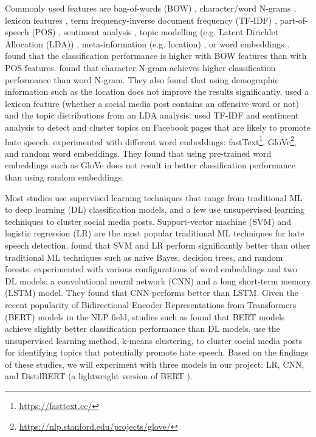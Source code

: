 %
Commonly used features are bag-of-words (BOW) \citep{greevy2004classifying}, character/word N-grams \citep{waseem2016hateful}, lexicon features \citep{xiang2012detecting},  term frequency-inverse document frequency (TF-IDF) \citep{badjatiya2017deep, davidson2017automated, rodriguez2019automatic}, part-of-speech (POS) \citep{greevy2004classifying}, sentiment analysis \citep{rodriguez2019automatic}, topic modelling (e.g. Latent Dirichlet Allocation (LDA)) \citep{xiang2012detecting}, meta-information (e.g. location) \citep{waseem2016hateful}, or word embeddings \citep{badjatiya2017deep, agrawal2018deep}.
%
\citet{greevy2004classifying} found that the classification performance is higher with BOW features than with POS features.
%
\citet{waseem2016hateful} found that character N-gram achieves higher classification performance than word N-gram.
%
They also found that using demographic information such as the location does not improve the results significantly.
%
\citet{xiang2012detecting} used a lexicon feature (whether a social media post contains an offensive word or not) and the topic distributions from an LDA analysis.
%
\citet{rodriguez2019automatic} used TF-IDF and sentiment analysis to detect and cluster topics on Facebook pages that are likely to promote hate speech.
%
\citet{badjatiya2017deep} experimented with different word embeddings: fastText\footnote{\url{https://fasttext.cc/}}, GloVe\footnote{\url{https://nlp.stanford.edu/projects/glove/}}, and random word embeddings.
%
They found that using pre-trained word embeddings such as GloVe does not result in better classification performance than using random embeddings.
%

Most studies use supervised learning techniques that range from traditional ML to deep learning (DL) classification models, and a few use unsupervised learning techniques to cluster social media posts.
%
Support-vector machine (SVM) \citep{greevy2004classifying, xiang2012detecting,davidson2017automated} and logistic regression (LR) \citep{waseem2016hateful, davidson2017automated} are the most popular traditional ML techniques for hate speech detection.
%
\citet{davidson2017automated} found that SVM and LR perform significantly better than other traditional ML techniques such as naive Bayes, decision trees, and random forests.
%
\citet{badjatiya2017deep} experimented with various configurations of word embeddings and two DL models: a convolutional neural network (CNN) and a long short-term memory (LSTM) model.
%
They found that CNN performs better than LSTM.
%
Given the recent popularity of Bidirectional Encoder Representations from Transformers (BERT) models \citep{devlin2018bert} in the NLP field, studies such as \citet{alatawi2021detecting} found that BERT models achieve slightly better classification performance than DL models.
%
\citet{rodriguez2019automatic} use the unsupervised learning method, k-means clustering, to cluster social media posts for identifying topics that potentially promote hate speech.
%
Based on the findings of these studies, we will experiment with three models in our project: LR, CNN, and DistilBERT (a lightweight version of BERT \citep{sanh2019distilbert}).


